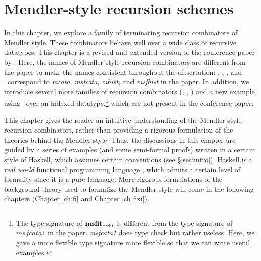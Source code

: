 \chapter{Mendler-style recursion schemes}\label{ch:mendler}
In this chapter, we explore a family of terminating recursion combinators
of Mendler style. These combinators behave well over a wide class of
recursive datatypes. This chapter is a revised and extended version of
the conference paper by \citet{AhnShe11}. Here, the names of Mendler-style
recursion combinators are different from the paper to make the names
consistent throughout the dissertation: \MIt, \MsfIt, \McvIt, and
\MsfcvIt\ correspond to \textit{mcata}, \textit{msfcata}, \textit{mhist},
and \textit{msfhist} in the paper. In addition, we introduce several
more families of recursion combinators (\MPr, \McvPr, \McvPr)
and a new example using \MsfIt\ over an indexed datatype,\footnote{
	The type signature of $\mathbf{msfit}_{* -> *}$ is different
	from the type signature of $\textit{msfcata1}$ in the paper. 
	\textit{msfcata1} does type check but rather useless.
	Here, we gave a more flexible type signature more flexible
	so that we can write useful examples.}
which are not present in the conference paper.

This chapter gives the reader an intuitive understanding of the Mendler-style
recursion combinators, rather than providing a rigorous formulation of
the theories behind the Mendler-style. Thus, the discussions in this chapter
are guided by a series of examples (and some semi-formal proofs) written
in a certain style of Haskell, which assumes certain conventions
(see \S\ref{sec:intro}).  Haskell is a \emph{real world}
functional programming language \cite{OSullivan08}, which admits
a certain level of formality since it is a pure language.
More rigorous formulations of the background theory used to formalize
the Mendler style will come in the following chapters
(Chapter \ref{ch:fi} and Chapter \ref{ch:fixi}).





